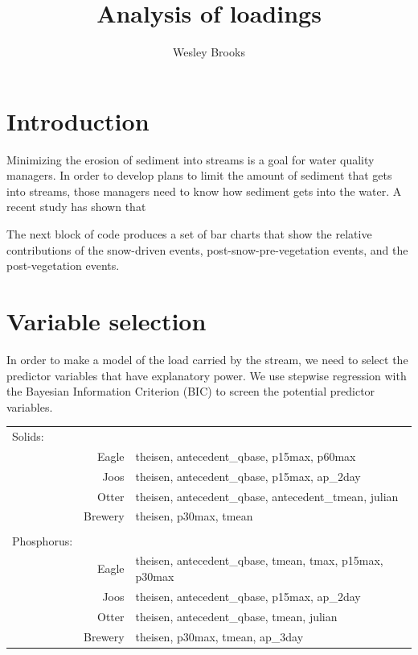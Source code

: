 \documentclass[12pt]{article}
\title{Analysis of loadings}
\author{Wesley Brooks}
\date{}                                           %
\begin{document}
\maketitle


\section{Introduction}
Minimizing the erosion of sediment into streams is a goal for water quality managers. In order to develop plans to limit the amount of sediment that gets into streams, those managers need to know how sediment gets into the water. A recent study \cite{Danz:2010} has shown that 

The next block of code produces a set of bar charts that show the relative contributions of the snow-driven events, post-snow-pre-vegetation events, and the post-vegetation events.\\





\section{Variable selection}
In order to make a model of the load carried by the stream, we need to select the predictor variables that have explanatory power. We use stepwise regression with the Bayesian Information Criterion (BIC) to screen the potential predictor variables.


\begin{table}[h]
    \begin{center}
    \begin{tabular}{lrl}
        Solids: & & \\
        & Eagle & theisen, antecedent\_qbase, p15max, p60max\\
        & Joos & theisen, antecedent\_qbase, p15max, ap\_2day\\
        & Otter & theisen, antecedent\_qbase, antecedent\_tmean, julian\\
        & Brewery & theisen, p30max, tmean\\
        \hline \\
        Phosphorus: & & \\
        & Eagle & theisen, antecedent\_qbase, tmean, tmax, p15max, p30max\\
        & Joos & theisen, antecedent\_qbase, p15max, ap\_2day\\
        & Otter & theisen, antecedent\_qbase, tmean, julian\\
        & Brewery & theisen, p30max, tmean, ap\_3day\\
    \end{tabular}
    \end{center}
\end{table}
\end{document}
